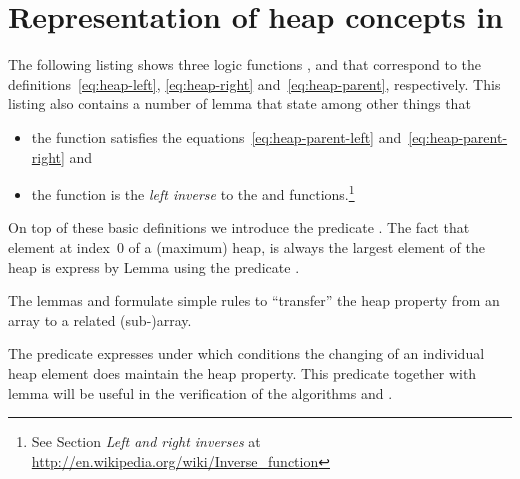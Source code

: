 
\section{Representation of heap concepts in \acsl}

The following listing shows three logic functions
\HeapLeft, \HeapRight and \HeapParent
that correspond to the definitions~\eqref{eq:heap-left},
\eqref{eq:heap-right} and~\eqref{eq:heap-parent}, respectively.
This listing also contains a number of \acsl lemma that state among other things that

\begin{itemize}
\item
the \HeapParent function satisfies the equations~\eqref{eq:heap-parent-left}
and~\eqref{eq:heap-parent-right} and
\item
the function \HeapParent 
is the \emph{left inverse} to the \HeapLeft and \HeapRight functions.\footnote{
 See Section \emph{Left and right inverses} at
 \url{http://en.wikipedia.org/wiki/Inverse_function}
}
\end{itemize}



\clearpage

On top of these basic definitions we introduce the predicate .
The fact that element at index~0 of a (maximum) heap, is always the largest element of the heap
is express by Lemma  using the predicate .



The lemmas \HeapShrink and \HeapUnchanged formulate simple rules to
``transfer'' the heap property from an array to a related (sub-)array.

The predicate \HeapCompatible expresses under which
conditions the changing of an individual heap element does maintain the heap
property.
This predicate together with lemma \HeapCompatibleUpdate 
will be useful in the verification of the 
algorithms  and .

\clearpage

